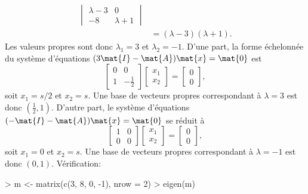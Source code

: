 \begin{exercice}
\begin{sol}
\begin{enumerate}
\begin{align*}
\begin{vmatrix}
          \lambda - 3 & 0 \\
          -8 & \lambda + 1
        \end{vmatrix} \\
        &= (\lambda - 3)(\lambda + 1).
      \end{align*}
      Les valeurs propres sont donc $\lambda_1 = 3$ et $\lambda_2 =
      -1$. D'une part, la forme échelonnée du système d'équations $(3
      \mat{I} - \mat{A}) \mat{x} = \mat{0}$ est
      \begin{displaymath}
        \begin{bmatrix} 0 & 0 \\ 1 & -\frac{1}{2} \end{bmatrix}
        \begin{bmatrix} x_1 \\ x_2 \end{bmatrix} =
        \begin{bmatrix} 0 \\ 0 \end{bmatrix},
      \end{displaymath}
      soit $x_1 = s/2$ et $x_2 = s$. Une base de vecteurs propres
      correspondant à $\lambda = 3$ est donc $(\frac{1}{2}, 1)$.
      D'autre part, le système d'équations $(-\mat{I} - \mat{A})
      \mat{x} = \mat{0}$ se réduit à
      \begin{displaymath}
        \begin{bmatrix} 1 & 0 \\ 0 & 0 \end{bmatrix}
        \begin{bmatrix} x_1 \\ x_2 \end{bmatrix} =
        \begin{bmatrix} 0 \\ 0 \end{bmatrix},
      \end{displaymath}
      soit $x_1 = 0$ et $x_2 = s$. Une base de vecteurs propres
      correspondant à $\lambda = -1$ est donc $(0, 1)$. Vérification:
\begin{Schunk}
\begin{Sinput}
> m <- matrix(c(3, 8, 0, -1), nrow = 2)
> eigen(m)
\end{Sinput}
\end{Schunk}
\end{enumerate}
\end{sol}
\end{exercice}
